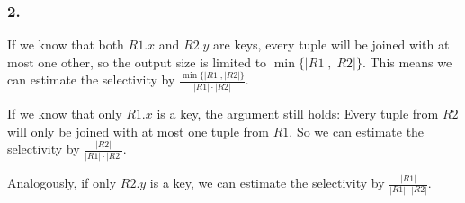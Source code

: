\documentclass{scrartcl}
\begin{document}
\subsubsection*{2.}

If we know that both $R1.x$ and $R2.y$ are keys, every tuple will be joined with
at most one other, so the output size is limited to $\min\{|R1|, |R2|\}$. This
means we can estimate the selectivity by $\frac{\min\{|R1|, |R2|\}}{|R1| \cdot
|R2|}$.

If we know that only $R1.x$ is a key, the argument still holds: Every tuple from
$R2$ will only be joined with at most one tuple from $R1$. So we can estimate
the selectivity by $\frac{|R2|}{|R1| \cdot |R2|}$.

Analogously, if only $R2.y$ is a key, we can estimate the selectivity by
$\frac{|R1|}{|R1| \cdot |R2|}$.
\end{document}
